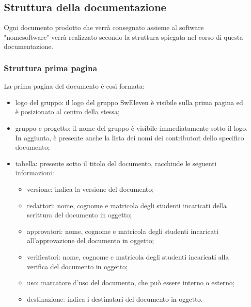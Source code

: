 \subsection{Struttura della documentazione}
Ogni documento prodotto che verrà consegnato assieme al software "nomesoftware" verrà realizzato secondo la struttura spiegata nel corso di questa documentazione.

\subsubsection{Struttura prima pagina}
La prima pagina del documento è così formata:
\begin{itemize}
	\item logo del gruppo: il logo del gruppo SwEleven è visibile sulla prima pagina ed è posizionato al centro della stessa;
	\item gruppo e progetto: il nome del gruppo è visibile immediatamente sotto il logo. In aggiunta, è presente anche la lista dei nomi dei contributori dello specifico documento;
	\item tabella: presente sotto il titolo del documento, racchiude le seguenti informazioni:
	\begin{itemize}
		\item versione: indica la versione del documento;
		\item redattori: nome, cognome e matricola degli studenti incaricati della scrittura del documento in oggetto;
		\item approvatori: nome, cognome e matricola degli studenti incaricati all’approvazione del documento in oggetto;
		\item verificatori: nome, cognome e matricola degli studenti incaricati alla verifica del documento in oggetto;
		\item uso: marcatore d’uso del documento, che può essere interno o esterno;
		\item destinazione: indica i destinatari del documento in oggetto.
		\end{itemize}
	\end{itemize}
	
